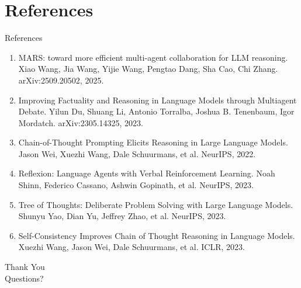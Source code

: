 \documentclass[10pt]{beamer}
\begin{document}
\section{References}
\begin{frame}[allowframebreaks]{References}
  \footnotesize
  \begin{enumerate}
    \item MARS: toward more efficient multi-agent collaboration for LLM reasoning. Xiao Wang, Jia Wang, Yijie Wang, Pengtao Dang, Sha Cao, Chi Zhang. arXiv:2509.20502, 2025.
    \item Improving Factuality and Reasoning in Language Models through Multiagent Debate. Yilun Du, Shuang Li, Antonio Torralba, Joshua B. Tenenbaum, Igor Mordatch. arXiv:2305.14325, 2023.
    \item Chain-of-Thought Prompting Elicits Reasoning in Large Language Models. Jason Wei, Xuezhi Wang, Dale Schuurmans, et al. NeurIPS, 2022.
    \item Reflexion: Language Agents with Verbal Reinforcement Learning. Noah Shinn, Federico Cassano, Ashwin Gopinath, et al. NeurIPS, 2023.
    \item Tree of Thoughts: Deliberate Problem Solving with Large Language Models. Shunyu Yao, Dian Yu, Jeffrey Zhao, et al. NeurIPS, 2023.
    \item Self-Consistency Improves Chain of Thought Reasoning in Language Models. Xuezhi Wang, Jason Wei, Dale Schuurmans, et al. ICLR, 2023.
  \end{enumerate}
\end{frame}

\begin{frame}[plain]
  \begin{center}
    {\Huge Thank You}\\[1em]
    {\large Questions?}
  \end{center}
\end{frame}
\end{document}
